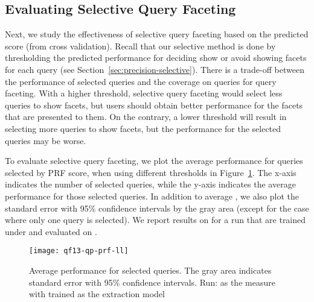 \subsection{Evaluating Selective Query Faceting}
Next, we study the effectiveness of selective query faceting based on the predicted score (from cross validation). Recall that our selective method is done by thresholding the predicted performance for deciding show or avoid showing facets for each query (see Section~\ref{sec:precision-selective}). There is a trade-off between the performance of selected queries and the coverage on queries for query faceting. With a higher threshold, selective query faceting would select less queries to show facets, but users should obtain better performance for the facets that are presented to them. On the contrary, a lower threshold will result in selecting more queries to show facets, but the performance for the selected queries may be worse. 

To evaluate selective query faceting, we plot the average \PRF performance for queries selected by PRF score, when using different thresholds in Figure~\ref{fig:selective}. The x-axis indicates the number of selected queries, while the y-axis indicates the average \PRF performance for those selected queries. In addition to average \PRF, we also plot the standard error with 95\% confidence intervals by the gray area (except for the case where only one query is selected). We report results on \DQF for a \QFI run that are trained under \MLE and evaluated on . 

\begin{figure}[ht!]
\centering
\caption{Average \PRF performance for selected queries. The gray area indicates standard error with 95\% confidence intervals. Run:  as the measure with \MLE trained \QFI as the extraction model}
\label{fig:selective}
\texttt{[image: qf13-qp-prf-ll]}
\end{figure}


